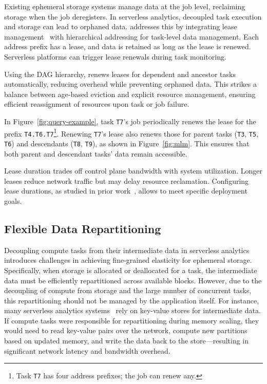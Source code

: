 Existing ephemeral storage systems manage data at the job level, reclaiming storage when the job deregisters. In serverless analytics, decoupled task execution and storage can lead to orphaned data. \jiffy addresses this by integrating lease management~\cite{gray1989leases, chubby, dhcplease} with hierarchical addressing for task-level data management. Each address prefix has a lease, and data is retained as long as the lease is renewed. Serverless platforms can trigger lease renewals during task monitoring.

Using the DAG hierarchy, \jiffy renews leases for dependent and ancestor tasks automatically, reducing overhead while preventing orphaned data. This strikes a balance between age-based eviction and explicit resource management, ensuring efficient reassignment of resources upon task or job failure.

 In Figure~\ref{fig:query-example}, task \texttt{T7}'s job periodically renews the lease for the prefix \texttt{T4.T6.T7}\footnote{Task \texttt{T7} has four address prefixes; the job can renew any.}. Renewing \texttt{T7}'s lease also renews those for parent tasks (\texttt{T3}, \texttt{T5}, \texttt{T6}) and descendants (\texttt{T8}, \texttt{T9}), as shown in Figure~\ref{fig:mlm}. This ensures that both parent and descendant tasks' data remain accessible.

 Lease duration trades off control plane bandwidth with system utilization. Longer leases reduce network traffic but may delay resource reclamation. Configuring lease durations, as studied in prior work~\cite{chubby, gray1989leases}, allows \jiffy to meet specific deployment goals.






\subsection{Flexible Data Repartitioning}
\label{ssec:fdr}

Decoupling compute tasks from their intermediate data in serverless analytics introduces challenges in achieving fine-grained elasticity for ephemeral storage. Specifically, when storage is allocated or deallocated for a task, the intermediate data must be efficiently repartitioned across available blocks. However, due to the decoupling of compute from storage and the large number of concurrent tasks, this repartitioning should not be managed by the application itself. For instance, many serverless analytics systems~\cite{locus, pocket} rely on key-value stores for intermediate data. If compute tasks were responsible for repartitioning during memory scaling, they would need to read key-value pairs over the network, compute new partitions based on updated memory, and write the data back to the store—resulting in significant network latency and bandwidth overhead.

